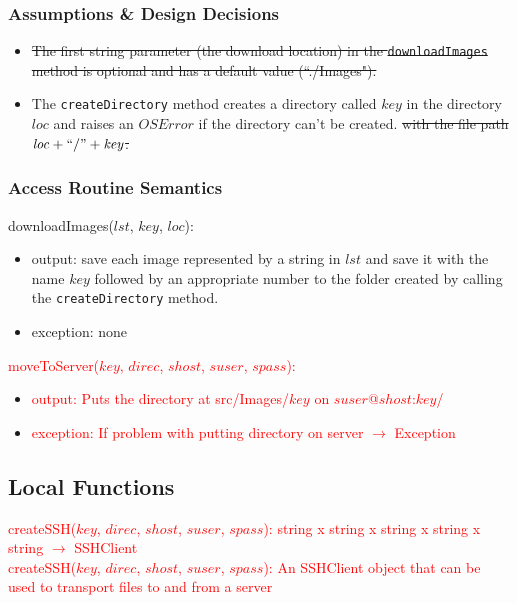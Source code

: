 \documentclass{article}
\begin{document}
\subsubsection* {Assumptions \& Design Decisions}

\begin{itemize}
\item \st{The first string parameter (the download location) in the \texttt{downloadImages} method is optional and has a default value (``./Images").}
\item The \texttt{createDirectory} method creates a directory 
\color{red}called $\mathit{key}$ in the directory $\mathit{loc}$ and raises an $\mathit{OSError}$ if the directory can't be created. \color{black} \st{with the file path $\mathit{loc} + ``/" + \mathit{key}$.}
\end{itemize}

\subsubsection* {Access Routine Semantics}

\noindent downloadImages($lst$, $key$, $loc$):
\begin{itemize}
\item output: save each image represented by a string in $lst$ and save it \color{red} with the name $key$ followed by an appropriate number \color{black} to the folder created by \color{red}calling \color{black} the \texttt{createDirectory} method.
\item exception: none
\end{itemize}

\noindent \textcolor{red}{moveToServer($key$, $direc$, $shost$, $suser$, $spass$):}
\begin{itemize}
\item \textcolor{red}{output:} \textcolor{red}{Puts the directory at src/Images/$key$ on $suser$@$shost$:$key$/}
\item \textcolor{red}{exception:} \textcolor{red}{If problem with putting directory on server $\rightarrow$ Exception}
\end{itemize}

\subsection* {Local Functions}

\noindent \textcolor{red}{createSSH($key$, $direc$, $shost$, $suser$, $spass$): 
string x string x string x string x string $\rightarrow$ SSHClient} \\
\textcolor{red}{createSSH($key$, $direc$, $shost$, $suser$, $spass$): 
An SSHClient object that can be used to transport files to and from a server} \\
\end{document}
